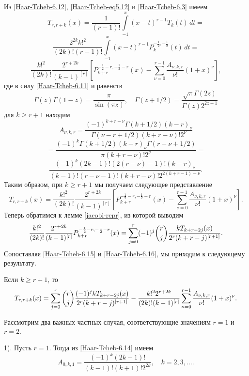 Из  \eqref{Haar-Tcheb-6.12},  \eqref{Haar-Tcheb-eq5.12} и \eqref{Haar-Tcheb-6.3}  имеем
$$
T_{r,r+k}(x)=\frac{1}{(r-1)!}\int\limits^x_{-1}(x-t)^{r-1}T_k(t)\,dt=
$$
$$
\frac{2^{2k}k!^2}{(2k)!(r-1)!}\int\limits^x_{-1}(x-t)^{r-1}P_k^{-\frac12,-\frac12}(t)\,dt=
$$
\begin{equation}\label{Haar-Tcheb-6.13}
\frac{k!^2}{(2k)!}
\frac{2^{r+2k}}{(k-1)^{[r]}}\left[P_{k+r}^{-\frac12-r,-\frac12-r}(x)-\sum^{r-1}_{\nu=0}
\frac{A_{\nu,k,r}}{\nu!}(1+x)^{\nu}\right],
\end{equation}
где в силу \eqref{Haar-Tcheb-6.11} и равенств
$$
\Gamma(z)\Gamma(1-z)=\frac{\pi}{\sin(\pi z)},\quad \Gamma(z+1/2)=\frac{\sqrt{\pi}\Gamma(2z)}{\Gamma(z)2^{2z-1}}
$$
 для $k\ge r+1$ находим
$$
A_{\nu,k,r}=
\frac{(-1)^{k+r-\nu}\Gamma(k+1/2)(k-r)_{\nu}}{\Gamma(\nu-r+1/2)(k+r-\nu)!2^\nu}
$$
$$
=\frac{(-1)^{k}\Gamma(k+1/2)(k-r)_{\nu}\Gamma(r-\nu+1/2)}{\pi (k+r-\nu)!2^\nu}=
$$
\begin{equation}\label{Haar-Tcheb-6.14}
\frac{(-1)^{k}(2k-1)!(2(r-\nu)-1)!(k-r)_{\nu}}{(k-1)!(r-\nu-1)! (k+r-\nu)!2^{2(k+r-1)-\nu}}.
\end{equation}
Таким образом, при $k\ge r+1$ мы получаем следующее представление
\begin{equation}\label{Haar-Tcheb-6.15}
T_{r,r+k}(x)=\frac{k!^2}{(2k)!}
\frac{2^{r+2k}}{(k-1)^{[r]}}\left[P_{k+r}^{-\frac12-r,-\frac12-r}(x)-
\sum^{r-1}_{\nu=0}\frac{A_{\nu,k,r}}{\nu!}(1+x)^{\nu}\right].
\end{equation}
Теперь обратимся к лемме \ref{jacobi-repr}, из которой выводим
\begin{equation}\label{Haar-Tcheb-6.16}
\frac{k!^2}{(2k)!}
\frac{2^{r+2k}}{(k-1)^{[r]}}P_{k+r}^{-\frac12-r,-\frac12-r}(x)=
\sum_{j=0}^r(-1)^j{r\choose j}
{kT_{k+r-2j}(x)\over2^r(k+r-j)^{[r+1]}}.
\end{equation}
Сопоставляя \eqref{Haar-Tcheb-6.15} и  \eqref{Haar-Tcheb-6.16}, мы приходим к следующему результату.
\begin{theorem}
Если  $k\ge r+1$, то
\begin{equation}\label{Haar-Tcheb-6.17}
T_{r,r+k}(x)=\sum_{j=0}^r{r\choose j}
{(-1)^jkT_{k+r-2j}(x)\over2^r(k+r-j)^{[r+1]}}
-\frac{k!^22^{r+2k}}{(2k)!(k-1)^{[r]}}
\sum^{r-1}_{\nu=0}\frac{A_{\nu,k,r}}{\nu!}(1+x)^{\nu}.
\end{equation}
\end{theorem}

Рассмотрим два важных частных случая, соответствующие  значениям   $r=1$  и $r=2$.


1). Пусть $r=1$. Тогда из \eqref{Haar-Tcheb-6.14} имеем
\begin{equation}\label{Haar-Tcheb-6.18}
A_{0,k,1}=\frac{(-1)^{k}(2k-1)!}{(k-1)!(k+1)!2^{2k}}, \quad k=2,3,\ldots.
\end{equation}

